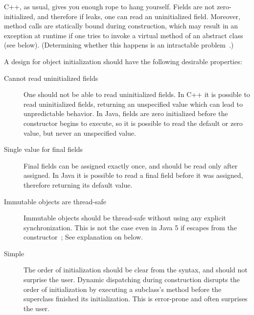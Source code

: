 \mbox{C++}, as usual, gives you enough rope to hang yourself.
Fields are not zero-initialized, and therefore if \this leaks,
    one can read an uninitialized field.
Moreover, method calls are statically bound during construction,
    which may result in an exception at runtime
    if one tries to invoke a virtual method of an abstract class (see  below).
(Determining whether this happens is an intractable problem~\cite{Gil:1998:CTA:646155.679689}.)

A design for object initialization should have the following
    desirable properties:
\begin{description}

  \item[Cannot read uninitialized fields]
    One should not be able to read uninitialized fields.
    In \mbox{C++} it is possible to read uninitialized fields,
        returning an unspecified value which can lead to unpredictable behavior.
    In Java, fields are zero initialized before the constructor begins to execute,
        so it is possible to read the default or zero value,
        but never an unspecified value.

  \item[Single value for final fields]
    Final fields can be assigned exactly once, and
        should be read only after assigned.
    In Java it is possible to read a final field before it was assigned,
        therefore returning its default value.

  \item[Immutable objects are thread-safe]
    Immutable objects should be thread-safe without using any explicit synchronization.
    This is not the case even in Java 5 if \this escapes from the constructor~\cite{JSR133};
        See explanation on  below.


  \item[Simple]
    The order of initialization should be clear from the syntax, %
        and should not surprise the user.
    Dynamic dispatching during construction disrupts the order
        of initialization by executing a subclass's method before the superclass finished its initialization.
    This is error-prone and often surprises the user.


\end{description}
